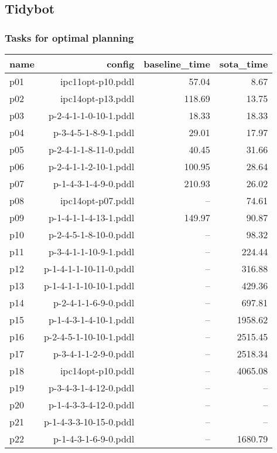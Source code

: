 \documentclass{article}
\begin{document}
                \newpage \subsection{Tidybot}
                    \subsubsection*{Tasks for optimal planning}
                    
                            \begin{center}
                            \scriptsize
                            \begin{tabular}{@{}l|r|r|r@{}}
                            name & config & baseline\_time & sota\_time\\\midrule
                              p01& ipc11opt-p10.pddl&57.04&8.67\\
  p02& ipc14opt-p13.pddl&118.69&13.75\\
  p03& p-2-4-1-1-0-10-1.pddl&18.33&18.33\\
  p04& p-3-4-5-1-8-9-1.pddl&29.01&17.97\\
  p05& p-2-4-1-1-8-11-0.pddl&40.45&31.66\\
  p06& p-2-4-1-1-2-10-1.pddl&100.95&28.64\\
  p07& p-1-4-3-1-4-9-0.pddl&210.93&26.02\\
  p08& ipc14opt-p07.pddl&--&74.61\\
  p09& p-1-4-1-1-4-13-1.pddl&149.97&90.87\\
  p10& p-2-4-5-1-8-10-0.pddl&--&98.32\\
  p11& p-3-4-1-1-10-9-1.pddl&--&224.44\\
  p12& p-1-4-1-1-10-11-0.pddl&--&316.88\\
  p13& p-1-4-1-1-10-10-1.pddl&--&429.36\\
  p14& p-2-4-1-1-6-9-0.pddl&--&697.81\\
  p15& p-1-4-3-1-4-10-1.pddl&--&1958.62\\
  p16& p-2-4-5-1-10-10-1.pddl&--&2515.45\\
  p17& p-3-4-1-1-2-9-0.pddl&--&2518.34\\
  p18& ipc14opt-p10.pddl&--&4065.08\\
  p19& p-3-4-3-1-4-12-0.pddl&--&--\\
  p20& p-1-4-3-3-4-12-0.pddl&--&--\\
  p21& p-1-4-3-3-10-15-0.pddl&--&--\\
  p22& p-1-4-3-1-6-9-0.pddl&--&1680.79\\

\end{tabular}
\end{center}
\end{document}
